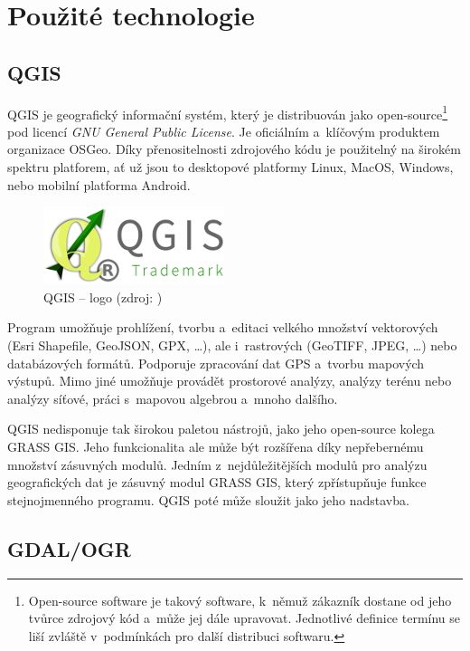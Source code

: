 \documentclass[a4paper,12pt,oneside]{book}
\begin{document}
\clearpage
\chapter{Použité technologie}

\section{QGIS}

QGIS je geografický informační systém, který je distribuován jako open-source\footnote{Open-source software je takový software, k~němuž zákazník dostane od jeho tvůrce zdrojový kód a~může jej dále upravovat. Jednotlivé definice termínu  se liší zvláště v~podmínkách pro další distribuci softwaru.\cite{abclinuxu_opensource}} pod licencí \textit{GNU General Public License}. Je oficiálním a~klíčovým produktem organizace OSGeo. Díky přenositelnosti zdrojového kódu je použitelný na širokém spektru platforem, ať už jsou to desktopové platformy Linux, MacOS, Windows, nebo mobilní platforma Android.

\begin{figure}[htb]
\centering
\includegraphics[scale=1]{images/qgis-logo.png}
\caption[QGIS -- logo]{QGIS -- logo (zdroj: \cite{qgis})}
\end{figure}

Program umožňuje prohlížení, tvorbu a~editaci velkého množství vektorových (Esri Shapefile, GeoJSON, GPX, \dots), ale i~rastrových (GeoTIFF, JPEG, \dots) nebo databázových formátů. Podporuje zpracování dat GPS a~tvorbu mapových výstupů. Mimo jiné umožňuje provádět prostorové analýzy, analýzy terénu nebo analýzy síťové, práci s~mapovou algebrou a~mnoho dalšího.

QGIS nedisponuje tak širokou paletou nástrojů, jako jeho open-source kolega GRASS GIS. Jeho funkcionalita ale může být rozšířena díky nepřebernému množství zásuvných modulů. Jedním z~nejdůležitějších modulů pro analýzu geografických dat je zásuvný modul GRASS GIS, který zpřístupňuje funkce stejnojmenného programu. QGIS poté může sloužit jako jeho nadstavba.
\cite{qgis}
\cite{qgis_wiki}


\section{GDAL/OGR}
\label{l_gdal}
\end{document}
